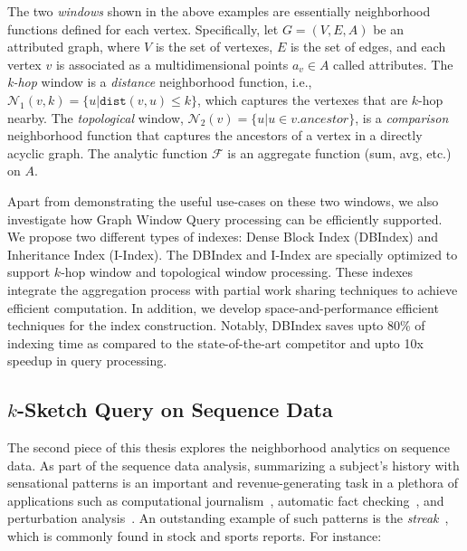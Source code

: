 
The two \emph{windows} shown in the above examples are essentially neighborhood functions defined for each vertex. Specifically, let $G=(V,E,A)$ be an attributed graph, where $V$ is the set of vertexes, $E$ is the set of edges, and each vertex $v$ is associated as a multidimensional points $a_v \in A$ called attributes.
The \emph{k-hop} window is a \emph{distance} neighborhood function, 
i.e., $\mathcal{N}_1(v,k)= \{u|\mathtt{dist}(v,u) \leq k\}$, 
which captures the vertexes that are $k$-hop nearby. 
The \emph{topological} window,  $\mathcal{N}_2(v)= \{u | u \in v.ancestor\}$,
is a \emph{comparison} neighborhood function that captures
the ancestors of a vertex in a directly acyclic graph.  The analytic function $\mathcal{F}$ is an aggregate function (sum, avg, etc.) on $A$.

Apart from demonstrating the useful use-cases on these two windows, 
we also investigate how Graph Window Query processing can be efficiently supported.  We propose
two different types of indexes: Dense Block Index (DBIndex)
and Inheritance Index (I-Index). The DBIndex and I-Index
are specially optimized to support $k$-hop window and topological
window processing. These indexes
integrate the aggregation process with partial work sharing techniques
to achieve efficient computation.
In addition, we develop space-and-performance efficient techniques
for the index construction. Notably, DBIndex saves upto 80\%
of indexing time as compared to the state-of-the-art competitor and upto 10x
speedup in query processing. 


\subsection{$k$-Sketch Query on Sequence Data}
The second piece of this thesis explores the neighborhood analytics on sequence data. 
As part of the sequence data analysis,
summarizing a subject's history with sensational patterns
is an important and revenue-generating task in a plethora of applications 
such as computational journalism~\cite{cohen2011computational,zhang2014discovering}, automatic fact checking~\cite{hassan2014data,walenz2014finding}, and perturbation analysis~\cite{Walenz:2016:PAD:3007328.3007330}.
%
An outstanding example of such patterns is the \emph{streak}~\cite{zhang2014discovering},
which is commonly found in stock
and sports reports. For instance:

